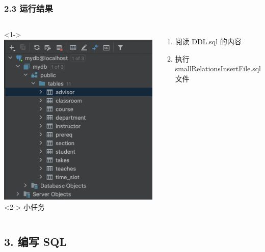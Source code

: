 \documentclass[aspectratio=169, 14pt]{beamer}
\begin{document}
\begin{frame}
	\frametitle{2.3 运行结果}
	\begin{columns}
		<1->
		\includegraphics[height=.8\paperheight]{week4/result}
		<2->
		小任务
		\begin{enumerate}
			\item 阅读 DDL.sql 的内容
			\item 执行 smallRelationsInsertFile.sql 文件
		\end{enumerate}
	\end{columns}
\end{frame}

\begin{frame}

	\section{\textcolor{darkmidnightblue}{3. 编写 SQL}}

\end{frame}
\end{document}
